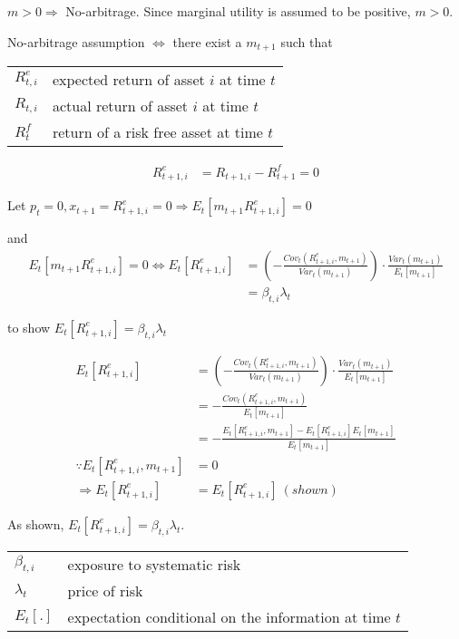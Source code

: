 \documentclass[11pt, oneside]{article}   	%
\begin{document}
$m > 0 \Rightarrow$ No-arbitrage. Since marginal utility is assumed to be positive, $m > 0$.

No-arbitrage assumption $\Leftrightarrow$ there exist a $m_{t+1}$ such that

\begin{tabular}{l @{ := } l}
    $R^e_{t,i}$ & expected return of asset $i$ at time $t$ \\
    $R_{t,i}$ & actual return of asset $i$ at time $t$ \\
    $R^f_t$ & return of a risk free asset at time $t$
\end{tabular}

\begin{align*}
    R^e_{t+1, i} &= R_{t+1, i} - R^f_{t+1} = 0
\end{align*}

Let $p_t = 0, x_{t+1} = R^e_{t+1, i} = 0 \Rightarrow E_t\left[ m_{t+1}R^e_{t+1, i}  \right] =0$

and
\begin{align*}
    E_t\left[ m_{t+1}R^e_{t+1, i}  \right] = 0 \Leftrightarrow E_t\left[ R^e_{t+1,i}  \right] 
    &= \left( - \frac{Cov_t(R^e_{t+1, i}, m_{t+1} )}{Var_t(m_{t+1})}  \right) \cdot \frac{Var_t(m_{t+1})}{E_t\left[ m_{t+1}  \right]} \\
    &= \beta_{t,i}\lambda_t
\end{align*}

to show $E_t\left[ R^e_{t+1, i}  \right] = \beta_{t, i}\lambda_t$

\begin{align*}
    E_t\left[ R^e_{t+1,i}  \right] &=
    \left( - \frac{Cov_t(R^e_{t+1, i}, m_{t+1} )}{Var_t(m_{t+1})}  \right) \cdot \frac{Var_t(m_{t+1})}{E_t\left[ m_{t+1}
    \right]} \\
                                   &= - \frac{Cov_t(R^e_{t+1, i}, m_{t+1})}{E_t\left[ m_{t+1}  \right]} \\
                                   &= - \frac{E_t\left[ R^e_{t+1, i}, m_{t+1}  \right] - E_t\left[ R^e_{t+1, i}
                                   \right]E_t\left[ m_{t+1}  \right]}{E_t\left[ m_{t+1}  \right]} \\
    \because E_t\left[ R^e_{t+1, i}, m_{t+1}  \right] &= 0 \\
    \Rightarrow E_t\left[ R^e_{t+1, i}  \right] &= E_t \left[ R^e_{t+1, i}  \right]~(shown)
\end{align*}

As shown, $E_t\left[ R^e_{t+1, i}  \right] = \beta_{t, i}\lambda_t$.

\begin{tabular}{l @{ := } l}
    $\beta_{t,i}$ & exposure to systematic risk \\
    $\lambda_t$ & price of risk \\
    $E_t[.]$  & expectation conditional on the information at time $t$
\end{tabular}
\end{document}
